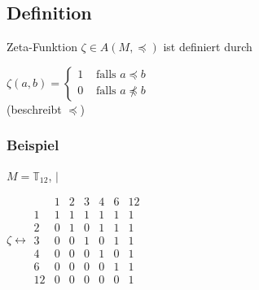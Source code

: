\subsection{Definition} %

Zeta-Funktion $\zeta \in A(M, \preceq)$  ist definiert durch

$\zeta(a, b) = \begin{cases}
1 & \text{ falls } a \preceq b \\
0 & \text{ falls } a \npreceq b
\end{cases}$
\\ (beschreibt $\preceq$)

\subsubsection*{Beispiel}

$M = \mathbb{T}_{12}$, $|$

$\zeta \leftrightarrow
%
\begin{array}{c|cccccc|}
& 1 & 2 & 3 & 4 & 6 & 12 \\\hline
1	& 1 & 1 & 1 & 1 & 1 & 1 \\
2 	& 0 & 1 & 0 & 1 & 1 & 1 \\
3 	& 0 & 0 & 1 & 0 & 1 & 1 \\
4	& 0 & 0 & 0 & 1 & 0 & 1 \\
6	& 0 & 0 & 0 & 0 & 1 & 1 \\
12 	& 0 & 0 & 0 & 0 & 0 & 1
\end{array}
%
$


